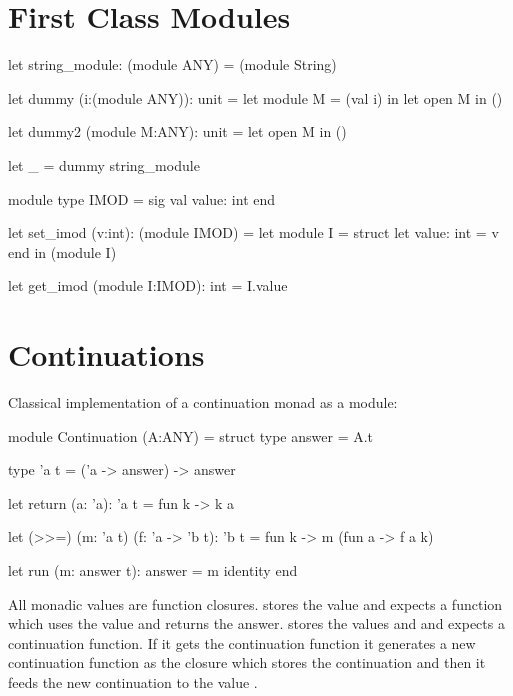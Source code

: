 \section{First Class Modules}


\begin{ocaml}
  let string_module: (module ANY) = (module String)

  let dummy (i:(module ANY)): unit =
    let module M = (val i) in
    let open M in
    ()

  let dummy2 (module M:ANY): unit =
    let open M in
    ()

  let _ = dummy string_module
\end{ocaml}


\begin{ocaml}
  module type IMOD =
    sig
      val value: int
    end

  let set_imod (v:int): (module IMOD) =
    let module I =
      struct
        let value: int = v
      end in
    (module I)

  let get_imod (module I:IMOD): int =
    I.value
\end{ocaml}





\section{Continuations}

Classical implementation of a continuation monad as a module:
%
\begin{ocaml}
    module Continuation (A:ANY) =
    struct
        type answer = A.t

        type 'a t = ('a -> answer) -> answer

        let return (a: 'a): 'a t =
            fun k ->
            k a

        let (>>=) (m: 'a t) (f: 'a -> 'b t): 'b t =
            fun k ->
            m (fun a -> f a k)

        let run (m: answer t): answer =
           m identity
    end
\end{ocaml}

All monadic values  are function closures.  stores
the value  and expects a function which uses the value and returns the
answer.  stores the values  and  and expects a
continuation function. If it gets the continuation function  it
generates a new continuation function as the closure  which
stores the continuation  and then it feeds the new continuation to the
value .


